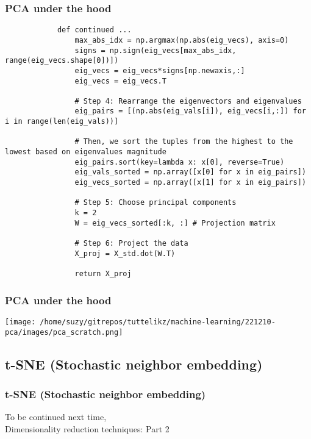 \documentclass{beamer}
\begin{document}
    \begin{frame}[fragile]
        \frametitle{PCA under the hood}
        \begin{center}
        \scriptsize
        \begin{verbatim}
            def continued ...
                max_abs_idx = np.argmax(np.abs(eig_vecs), axis=0)
                signs = np.sign(eig_vecs[max_abs_idx, range(eig_vecs.shape[0])])
                eig_vecs = eig_vecs*signs[np.newaxis,:]
                eig_vecs = eig_vecs.T

                # Step 4: Rearrange the eigenvectors and eigenvalues 
                eig_pairs = [(np.abs(eig_vals[i]), eig_vecs[i,:]) for i in range(len(eig_vals))]

                # Then, we sort the tuples from the highest to the lowest based on eigenvalues magnitude
                eig_pairs.sort(key=lambda x: x[0], reverse=True)
                eig_vals_sorted = np.array([x[0] for x in eig_pairs])
                eig_vecs_sorted = np.array([x[1] for x in eig_pairs])
                
                # Step 5: Choose principal components
                k = 2
                W = eig_vecs_sorted[:k, :] # Projection matrix

                # Step 6: Project the data
                X_proj = X_std.dot(W.T)

                return X_proj
        \end{verbatim}
        \end{center}
    \end{frame}

    \begin{frame}
        \frametitle{PCA under the hood}
        \begin{center}
            \texttt{[image: /home/suzy/gitrepos/tuttelikz/machine-learning/221210-pca/images/pca\_scratch.png]}
        \end{center}
    \end{frame}

    \subsection{t-SNE (Stochastic neighbor embedding)}
    \begin{frame}
        \frametitle{t-SNE (Stochastic neighbor embedding)}
        \begin{center}
            To be continued next time, \\ Dimensionality reduction techniques: Part 2
        \end{center}
    \end{frame}
\end{document}
